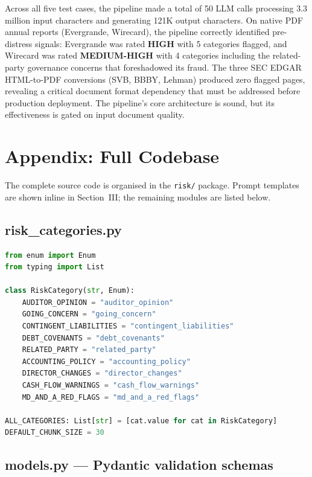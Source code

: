 \documentclass[12pt,a4paper]{article}
\begin{document}
Across all five test cases, the pipeline made a total of 50 LLM calls
processing 3.3\,million input characters and generating 121K output
characters. On native PDF annual reports (Evergrande, Wirecard), the
pipeline correctly identified pre-distress signals: Evergrande was rated
\textbf{HIGH} with 5 categories flagged, and Wirecard was rated
\textbf{MEDIUM-HIGH} with 4 categories including the related-party
governance concerns that foreshadowed its fraud. The three SEC EDGAR
HTML-to-PDF conversions (SVB, BBBY, Lehman) produced zero flagged pages,
revealing a critical document format dependency that must be addressed
before production deployment. The pipeline's core architecture is sound,
but its effectiveness is gated on input document quality.

\appendix
\section{Appendix: Full Codebase}

The complete source code is organised in the \texttt{risk/} package.
Prompt templates are shown inline in Section~III; the remaining modules
are listed below.

\subsection{risk\_categories.py}

\begin{lstlisting}[language=Python]
from enum import Enum
from typing import List

class RiskCategory(str, Enum):
    AUDITOR_OPINION = "auditor_opinion"
    GOING_CONCERN = "going_concern"
    CONTINGENT_LIABILITIES = "contingent_liabilities"
    DEBT_COVENANTS = "debt_covenants"
    RELATED_PARTY = "related_party"
    ACCOUNTING_POLICY = "accounting_policy"
    DIRECTOR_CHANGES = "director_changes"
    CASH_FLOW_WARNINGS = "cash_flow_warnings"
    MD_AND_A_RED_FLAGS = "md_and_a_red_flags"

ALL_CATEGORIES: List[str] = [cat.value for cat in RiskCategory]
DEFAULT_CHUNK_SIZE = 30
\end{lstlisting}

\subsection{models.py --- Pydantic validation schemas}
\end{document}
